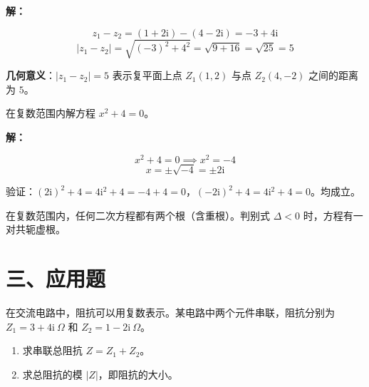 \documentclass[12pt, a4paper]{ctexart}
\begin{document}
\textbf{解：}

\[
z_1 - z_2 = (1 + 2\mathrm{i}) - (4 - 2\mathrm{i}) = -3 + 4\mathrm{i}
\]
\[
|z_1 - z_2| = \sqrt{(-3)^2 + 4^2} = \sqrt{9 + 16} = \sqrt{25} = 5
\]

\textbf{几何意义}：$|z_1 - z_2| = 5$ 表示复平面上点 $Z_1(1, 2)$ 与点 $Z_2(4, -2)$ 之间的距离为 $5$。

\begin{center}
\end{center}

\vspace{6pt}

\begin{examplebox}[【例题9】复数方程求解]
在复数范围内解方程 $x^2 + 4 = 0$。
\end{examplebox}

\textbf{解：}

\[
x^2 + 4 = 0 \implies x^2 = -4
\]
\[
x = \pm\sqrt{-4} = \pm 2\mathrm{i}
\]

验证：$(2\mathrm{i})^2 + 4 = 4\mathrm{i}^2 + 4 = -4 + 4 = 0$，$(-2\mathrm{i})^2 + 4 = 4\mathrm{i}^2 + 4 = 0$。均成立。

\begin{tipbox}[方法总结]
在复数范围内，任何二次方程都有两个根（含重根）。判别式 $\Delta < 0$ 时，方程有一对共轭虚根。
\end{tipbox}


\section*{\textcolor{apppurple}{三、应用题}}

\begin{appbox}[【应用1】电路中的复数阻抗]
在交流电路中，阻抗可以用复数表示。某电路中两个元件串联，阻抗分别为 $Z_1 = 3 + 4\mathrm{i}\ \Omega$ 和 $Z_2 = 1 - 2\mathrm{i}\ \Omega$。
\begin{enumerate}[leftmargin=2em]
  \item 求串联总阻抗 $Z = Z_1 + Z_2$。
  \item 求总阻抗的模 $|Z|$，即阻抗的大小。
\end{enumerate}
\end{appbox}
\end{document}
